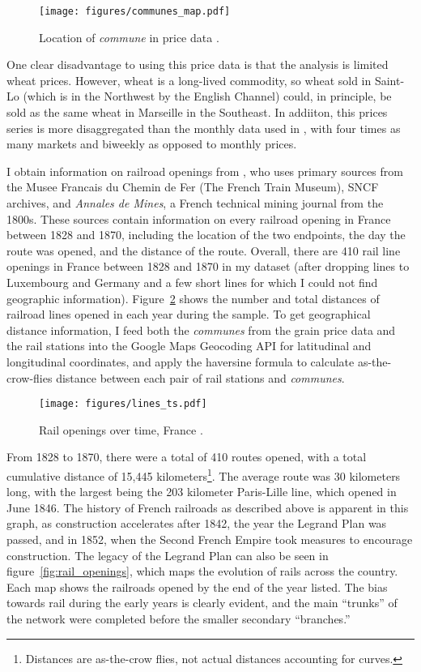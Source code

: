\documentclass[12pt,twoside]{article}
\begin{document}
\begin{figure}[ht]
	\centering
	\caption{Location of \emph{commune} in price data \citep{prices}.}
	\texttt{[image: figures/communes\_map.pdf]}
	\label{fig:communes_map}
\end{figure}

One clear disadvantage to using this price data is that the analysis is limited wheat prices.
However, wheat is a long-lived commodity, so wheat sold in Saint-Lo (which is in the Northwest by the English Channel) could, in principle, be sold as the same wheat in Marseille in the Southeast.
In addiiton, this prices series is more disaggregated than the monthly data used in \cite{persson}, with four times as many markets and biweekly as opposed to monthly prices.

I obtain information on railroad openings from \cite{palau2,palau3,palau4}, who uses primary sources from the Musee Francais du Chemin de Fer (The French Train Museum), SNCF archives, and \emph{Annales de Mines}, a French technical mining journal from the 1800s.
These sources contain information on every railroad opening in France between 1828 and 1870, including the location of the two endpoints, the day the route was opened, and the distance of the route.
Overall, there are 410 rail line openings in France between 1828 and 1870 in my dataset (after dropping lines to Luxembourg and Germany and a few short lines for which I could not find geographic information).
Figure~\ref{fig:lines_year} shows the number and total distances of railroad lines opened in each year during the sample.
To get geographical distance information, I feed both the \emph{communes} from the grain price data and the rail stations into the Google Maps Geocoding API \citep{google} for latitudinal and longitudinal coordinates, and apply the haversine formula to calculate as-the-crow-flies distance between each pair of rail stations and \emph{communes}.

\begin{figure}[ht]
	\centering
	\caption{Rail openings over time, France \citep{prices}.}
	\texttt{[image: figures/lines\_ts.pdf]}
	\label{fig:lines_year}
\end{figure}

From 1828 to 1870, there were a total of 410 routes opened, with a total cumulative distance of 15,445 kilometers\footnote{Distances are as-the-crow flies, not actual distances accounting for curves.}.
The average route was 30 kilometers long, with the largest being the 203 kilometer Paris-Lille line, which opened in June 1846.
The history of French railroads as described above is apparent in this graph, as construction accelerates after 1842, the year the Legrand Plan was passed, and in 1852, when the Second French Empire took measures to encourage construction.
The legacy of the Legrand Plan can also be seen in figure~\ref{fig:rail_openings}, which maps the evolution of rails across the country.
Each map shows the railroads opened by the end of the year listed.
The bias towards rail during the early years is clearly evident, and the main ``trunks'' of the network were completed before the smaller secondary ``branches.''
\end{document}
